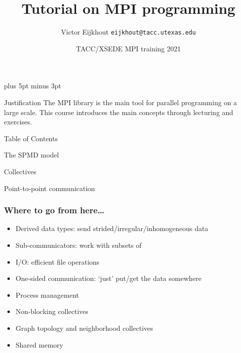 \documentclass[11pt,headernav]{beamer}
\newcounter{tacc}
\def\Location{}%
\def\courseyear{2021}
\def\Location{TACC HPC Training \courseyear}
\def\Location{TACC/XSEDE MPI training \courseyear}
\def\TitleExtra{}
\begin{document}
\parskip=10pt plus 5pt minus 3pt

\title{Tutorial on MPI programming\TitleExtra}
\author{Victor Eijkhout {\tt eijkhout@tacc.utexas.edu}}
\date{\Location}

\begin{frame}
  \titlepage
\end{frame}

\begin{xsede}
  
\end{xsede}

\begin{frame}{Justification}
  The MPI library is the main tool
  for parallel programming on a large scale.
  This course introduces the main concepts
  through lecturing and exercises.
\end{frame}

\begin{frame}{Table of Contents}
  \tableofcontents
\end{frame}


 {The SPMD model}


 {Collectives}


 {Point-to-point communication}


\iffalse
\begin{exerciseframe}[serialsend]
  
\end{exerciseframe}
\fi

\begin{frame}[containsverbatim]\frametitle{Where to go from here\ldots}
  \begin{itemize}
  \item Derived data types: send strided/irregular/inhomogeneous data
  \item Sub-communicators: work with subsets of 
  \item I/O: efficient file operations
  \item One-sided communication: `just' put/get the data somewhere
  \item Process management
  \item Non-blocking collectives
  \item Graph topology and neighborhood collectives
  \item Shared memory
  \end{itemize}
\end{frame}
\end{document}
